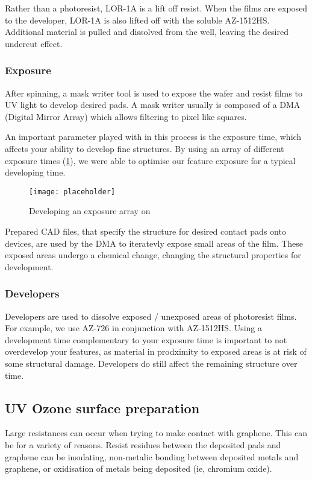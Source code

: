 \documentclass[../../Matt_Gebert_Honours_Thesis.tex]{subfiles}
\begin{document}
	Rather than a photoresist, LOR-1A is a lift off resist. When the films are exposed to the developer, LOR-1A is also lifted off with the soluble AZ-1512HS. Additional material is pulled and dissolved from the well, leaving the desired undercut effect. %
	
	\subsubsection{Exposure}\label{sec:exposure}
	After spinning, a mask writer tool is used to expose the wafer and resist films to UV light to develop desired pads. A mask writer usually is composed of a DMA (Digital Mirror Array) which allows filtering to pixel like squares. %
	
	An important parameter played with in this process is the exposure time, which affects your ability to develop fine structures. By using an array of different exposure times (\cref{fig:exposure_array}), we were able to optimise our feature exposure for a typical developing time.
	
	\begin{figure}[H]
		\centering
				\texttt{[image: placeholder]}
		\caption{Developing an exposure array on \silicondioxide}\label{fig:exposure_array}
	\end{figure}
	
	Prepared CAD files, that specify the structure for desired contact pads onto devices, are used by the DMA to iteratevly expose small areas of the film. These exposed areas undergo a chemical change, changing the structural properties for development.
	
	\subsubsection{Developers}\label{sec:developer}
	Developers are used to dissolve exposed / unexposed areas of photoresist films. For example, we use AZ-726 in conjunction with AZ-1512HS. Using a development time complementary to your exposure time is important to not overdevelop your features, as material in prodximity to exposed areas is at risk of some structural damage. Developers do still affect the remaining structure over time.
	
	\subsection{UV Ozone surface preparation}\label{sec:uv_ozone}
	Large resistances can occur when trying to make contact with graphene. This can be for a variety of reasons. Resist residues between the deposited pads and graphene can be insulating, non-metalic bonding between deposited metals and graphene, or oxidisation of metals being deposited (ie, chromium oxide).
	
\end{document}
